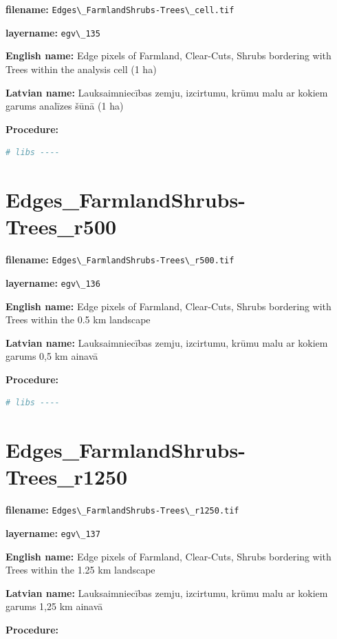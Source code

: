 \documentclass[
]{book}
\newcommand{\passthrough}[1]{#1}
\begin{document}
\textbf{filename:} \passthrough{\lstinline!Edges\_FarmlandShrubs-Trees\_cell.tif!}

\textbf{layername:} \passthrough{\lstinline!egv\_135!}

\textbf{English name:} Edge pixels of Farmland, Clear-Cuts, Shrubs bordering with Trees within the analysis cell (1 ha)

\textbf{Latvian name:} Lauksaimniecības zemju, izcirtumu, krūmu malu ar kokiem garums analīzes šūnā (1 ha)

\textbf{Procedure:}

\begin{lstlisting}[language=R]
# libs ----
\end{lstlisting}

\section{Edges\_FarmlandShrubs-Trees\_r500}\label{ch06.136}

\textbf{filename:} \passthrough{\lstinline!Edges\_FarmlandShrubs-Trees\_r500.tif!}

\textbf{layername:} \passthrough{\lstinline!egv\_136!}

\textbf{English name:} Edge pixels of Farmland, Clear-Cuts, Shrubs bordering with Trees within the 0.5 km landscape

\textbf{Latvian name:} Lauksaimniecības zemju, izcirtumu, krūmu malu ar kokiem garums 0,5 km ainavā

\textbf{Procedure:}

\begin{lstlisting}[language=R]
# libs ----
\end{lstlisting}

\section{Edges\_FarmlandShrubs-Trees\_r1250}\label{ch06.137}

\textbf{filename:} \passthrough{\lstinline!Edges\_FarmlandShrubs-Trees\_r1250.tif!}

\textbf{layername:} \passthrough{\lstinline!egv\_137!}

\textbf{English name:} Edge pixels of Farmland, Clear-Cuts, Shrubs bordering with Trees within the 1.25 km landscape

\textbf{Latvian name:} Lauksaimniecības zemju, izcirtumu, krūmu malu ar kokiem garums 1,25 km ainavā

\textbf{Procedure:}
\end{document}
